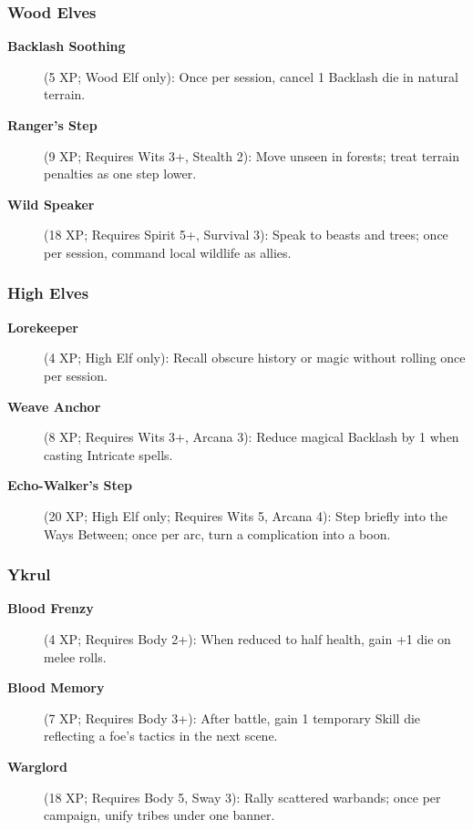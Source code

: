 \subsubsection{Wood Elves}
\label{subsubsec:wood-elf-talents}

\begin{description}
\item[\textbf{Backlash Soothing}] (5 XP; Wood Elf only): Once per session, cancel 1 Backlash die in natural terrain.
\item[\textbf{Ranger's Step}] (9 XP; Requires Wits 3+, Stealth 2): Move unseen in forests; treat terrain penalties as one step lower.
\item[\textbf{Wild Speaker}] (18 XP; Requires Spirit 5+, Survival 3): Speak to beasts and trees; once per session, command local wildlife as allies.
\end{description}

\subsubsection{High Elves}
\label{subsubsec:high-elf-talents}

\begin{description}
\item[\textbf{Lorekeeper}] (4 XP; High Elf only): Recall obscure history or magic without rolling once per session.
\item[\textbf{Weave Anchor}] (8 XP; Requires Wits 3+, Arcana 3): Reduce magical Backlash by 1 when casting Intricate spells.
\item[\textbf{Echo-Walker's Step}] (20 XP; High Elf only; Requires Wits 5, Arcana 4): Step briefly into the Ways Between; once per arc, turn a complication into a boon.
\end{description}

\subsubsection{Ykrul}
\label{subsubsec:ykrul-talents}

\begin{description}
\item[\textbf{Blood Frenzy}] (4 XP; Requires Body 2+): When reduced to half health, gain +1 die on melee rolls.
\item[\textbf{Blood Memory}] (7 XP; Requires Body 3+): After battle, gain 1 temporary Skill die reflecting a foe's tactics in the next scene.
\item[\textbf{Warglord}] (18 XP; Requires Body 5, Sway 3): Rally scattered warbands; once per campaign, unify tribes under one banner.
\end{description}

